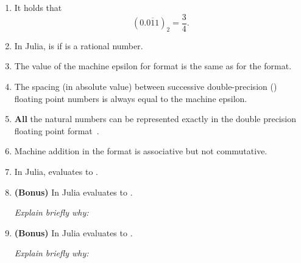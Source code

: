 \documentclass[a4paper]{article}
\begin{document}
\begin{enumerate}
    \item
        It holds that
        \[
            (0.\overline{011})_2 = \frac{3}{4}.
        \]

    \item
        In Julia,  is  if  is a rational number.

    \item
        The value of the machine epsilon for  format is the same as for the  format.

    \item
        The spacing (in absolute value) between successive double-precision () floating point numbers is always equal to the machine epsilon.

    \item
        \textbf{All} the natural numbers can be represented exactly in the double precision floating point format~.

    \item
        Machine addition in the  format is associative but not commutative.

    \item
        In Julia,  evaluates to .

    \item
        \textbf{(Bonus)}
        In Julia  evaluates to .

        \emph{Explain briefly why:}
        \vspace{2.5cm}

    \item
        \textbf{(Bonus)}
         In Julia  evaluates to .

        \emph{Explain briefly why:}
         \vspace{2.5cm}
\end{enumerate}
\end{document}
